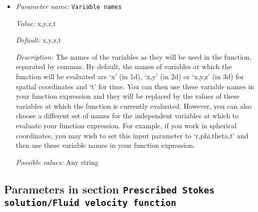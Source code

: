 \begin{itemize}
{\it Possible values:} Any string
\item {\it Parameter name:} {\tt Variable names}
\label{parameters:Prescribed Stokes solution/Fluid pressure function/Variable names}
\label{parameters:Prescribed_20Stokes_20solution/Fluid_20pressure_20function/Variable_20names}


{\it Value:} x,y,z,t


{\it Default:} x,y,z,t


{\it Description:} The names of the variables as they will be used in the function, separated by commas. By default, the names of variables at which the function will be evaluated are `x' (in 1d), `x,y' (in 2d) or `x,y,z' (in 3d) for spatial coordinates and `t' for time. You can then use these variable names in your function expression and they will be replaced by the values of these variables at which the function is currently evaluated. However, you can also choose a different set of names for the independent variables at which to evaluate your function expression. For example, if you work in spherical coordinates, you may wish to set this input parameter to `r,phi,theta,t' and then use these variable names in your function expression.


{\it Possible values:} Any string
\end{itemize}

\subsection{Parameters in section \tt Prescribed Stokes solution/Fluid velocity function}
\label{parameters:Prescribed_20Stokes_20solution/Fluid_20velocity_20function}

